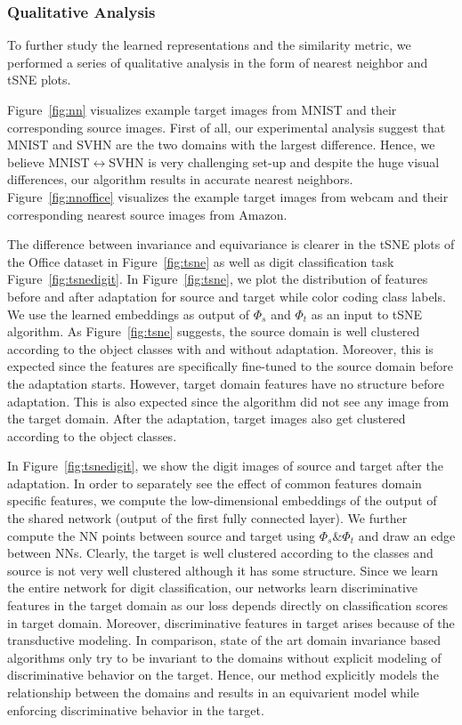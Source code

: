 \subsubsection{Qualitative Analysis}
To further study the learned representations and the similarity metric, we performed a series of qualitative analysis in the form of nearest neighbor and tSNE\cite{tsne} plots.


Figure~\ref{fig:nn} visualizes example target images from MNIST and their corresponding source images. First of all, our experimental analysis suggest that MNIST and SVHN are the two domains with the largest difference. Hence, we believe MNIST$\leftrightarrow$SVHN is very challenging set-up and despite the huge visual differences, our algorithm results in accurate nearest neighbors. Figure~\ref{fig:nnoffice} visualizes the example target images from webcam and their corresponding nearest source images from Amazon. 


The difference between invariance and equivariance is clearer in the tSNE plots of the Office dataset in Figure~\ref{fig:tsne} as well as digit classification task Figure~\ref{fig:tsnedigit}. In Figure~\ref{fig:tsne}, we plot the distribution of features before and after adaptation for source and target while color coding class labels. We use the learned embeddings as output of $\Phi_s$ and $\Phi_t$ as an input to tSNE algorithm\cite{tsne}. As Figure~\ref{fig:tsne} suggests, the source domain is well clustered according to the object classes with and without adaptation. Moreover, this is expected since the features are specifically fine-tuned to the source domain before the adaptation starts. However, target domain features have no structure before adaptation. This is also expected since the algorithm did not see any image from the target domain. After the adaptation, target images also get clustered according to the object classes. 




In Figure~\ref{fig:tsnedigit}, we show the digit images of source and target after the adaptation. In order to separately see the effect of common features domain specific features, we compute the low-dimensional embeddings of the output of the shared network (output of the first fully connected layer). We further compute the NN points between source and target using $\Phi_s \& \Phi_t$ and draw an edge between NNs. Clearly, the target is well clustered according to the classes and source is not very well clustered although it has some structure. Since we learn the entire network for digit classification, our networks learn discriminative features in the target domain as our loss depends directly on classification scores in target domain. Moreover, discriminative features in target arises because of the transductive modeling. In comparison, state of the art domain invariance based algorithms only try to be invariant to the domains without explicit modeling of discriminative behavior on the target. Hence, our method explicitly models the relationship between the domains and results in an equivarient model while enforcing discriminative behavior in the target. 



